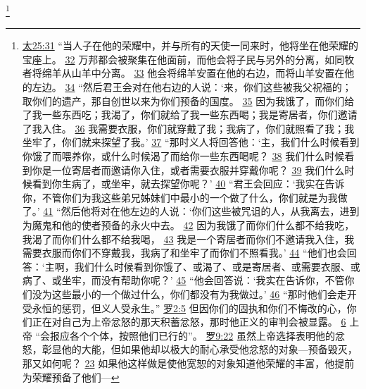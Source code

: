 \documentclass[12pt, a4paper, oneside]{ctexart}
\begin{document}
	\footnote {
		\href{https://biblehub.com/matthew/25-31.htm}{太25:31} “当人子在他的荣耀中，并与所有的天使一同来时，他将坐在他荣耀的宝座上。
		\href{https://biblehub.com/matthew/25-32.htm}{32} 万邦都会被聚集在他面前，而他会将子民与另外的分离，如同牧者将绵羊从山羊中分离。
		\href{https://biblehub.com/matthew/25-33.htm}{33} 他会将绵羊安置在他的右边，而将山羊安置在他的左边。
		\href{https://biblehub.com/matthew/25-34.htm}{34} “然后君王会对在他右边的人说：‘来，你们这些被我父祝福的；取你们的遗产，那自创世以来为你们预备的国度。
		\href{https://biblehub.com/matthew/25-35.htm}{35} 因为我饿了，而你们给了我一些东西吃；我渴了，你们就给了我一些东西喝；我是寄居者，你们邀请了我入住。
		\href{https://biblehub.com/matthew/25-36.htm}{36} 我需要衣服，你们就穿戴了我；我病了，你们就照看了我；我坐牢了，你们就来探望了我。’
		\href{https://biblehub.com/matthew/25-37.htm}{37} “那时义人将回答他：‘主，我们什么时候看到你饿了而喂养你，或什么时候渴了而给你一些东西喝呢？
		\href{https://biblehub.com/matthew/25-38.htm}{38} 我们什么时候看到你是一位寄居者而邀请你入住，或者需要衣服并穿戴你呢？
		\href{https://biblehub.com/matthew/25-39.htm}{39} 我们什么时候看到你生病了，或坐牢，就去探望你呢？’
		\href{https://biblehub.com/matthew/25-40.htm}{40} “君王会回应：‘我实在告诉你，不管你们为我这些弟兄姊妹们中最小的一个做了什么，你们就是为我做了。’
		\href{https://biblehub.com/matthew/25-41.htm}{41} “然后他将对在他左边的人说：‘你们这些被咒诅的人，从我离去，进到为魔鬼和他的使者预备的永火中去。
		\href{https://biblehub.com/matthew/25-42.htm}{42} 因为我饿了而你们什么都不给我吃，我渴了而你们什么都不给我喝，
		\href{https://biblehub.com/matthew/25-43.htm}{43} 我是一个寄居者而你们不邀请我入住，我需要衣服而你们不穿戴我，我病了和坐牢了而你们不照看我。’
		\href{https://biblehub.com/matthew/25-44.htm}{44} “他们也会回答：‘主啊，我们什么时候看到你饿了、或渴了、或是寄居者、或需要衣服、或病了、或坐牢，而没有帮助你呢？’
		\href{https://biblehub.com/matthew/25-45.htm}{45} “他会回答说：‘我实在告诉你，不管你们没为这些最小的一个做过什么，你们都没有为我做过。’
		\href{https://biblehub.com/matthew/25-46.htm}{46} “那时他们会走开受永恒的惩罚，但义人受永生。”
		\href{https://biblehub.com/romans/2-5.htm}{罗2:5} 但因你们的固执和你们不悔改的心，你们正在对自己为上帝忿怒的那天积蓄忿怒，那时他正义的审判会被显露。
		\href{https://biblehub.com/romans/2-6.htm}{6} 上帝 “会报应各个个体，按照他们已行的”。
		\href{https://biblehub.com/romans/9-22.htm}{罗9:22} 虽然上帝选择表明他的忿怒，彰显他的大能，但如果他却以极大的耐心承受他忿怒的对象---预备毁灭，那又如何呢？
		\href{https://biblehub.com/romans/9-23.htm}{23} 如果他这样做是使他宽恕的对象知道他荣耀的丰富，他提前为荣耀预备了他们---
}
\end{document}
